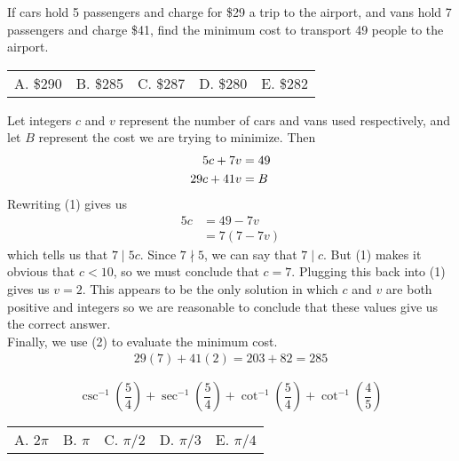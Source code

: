 \documentclass[12pt]{article}
\makeatletter
\newcounter{problem}
\newcommand{\multChoice}[5]{
    \begin{tabular}{l @{\hskip 1.5cm} l @{\hskip 1.5cm} l @{\hskip 1.5cm} l @{\hskip 1.5cm} l}
    A. #1 & B. #2 & C. #3 & D. #4 & E. #5
\end{tabular}

}
\makeatother
\begin{document}
\begin{problem}
   If cars hold 5 passengers and charge for \$29 a trip to the airport, and vans hold 7 passengers and charge \$41, find the minimum cost to transport 49 people to the airport. \\
\end{problem}
\multChoice{\$290}{\$285}{\$287}{\$280}{\$282}


\begin{solution}[B. \$285]
   Let integers $c$ and $v$ represent the number of cars and vans used respectively, and let $B$ represent the cost we are trying to minimize. Then
   \begin{align} \setcounter{equation}{0}
       5c + 7v &= 49 \\
       29c + 41v &= B
   \end{align}
   Rewriting (1) gives us
   \begin{align*}
       5c &= 49 - 7v \\
       &= 7(7-7v)
   \end{align*}
   which tells us that $7 \mid 5c$. Since $7 \nmid 5$, we can say that $7 \mid c$. But (1) makes it obvious that $c < 10$, so we must conclude that $c=7$. Plugging this back into (1) gives us $v=2$. This appears to be the only solution in which $c$ and $v$ are both positive and integers so we are reasonable to conclude that these values give us the correct answer. \\[5pt] Finally, we use (2) to evaluate the minimum cost.
   \begin{align*}
       29(7) + 41(2) = 203 + 82 = \boxed{285}
   \end{align*}
\end{solution}

\begin{problem}
   $$ \csc^{-1}{\left(\frac{5}{4}\right)}+\sec^{-1}{\left(\frac{5}{4}\right)}+\cot^{-1}{\left(\frac{5}{4}\right)}+\cot^{-1}{\left(\frac{4}{5}\right)}$$
\end{problem}
\multChoice{$2\pi$}{$\pi$}{$\pi/2$}{$\pi/3$}{$\pi/4$}
\end{document}
